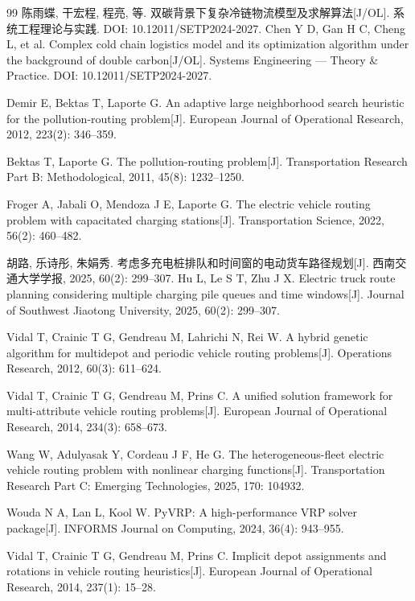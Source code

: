 \documentclass{setp-new}
\begin{document}
\begin{thebibliography}{99}
 陈雨蝶, 干宏程, 程亮, 等. 双碳背景下复杂冷链物流模型及求解算法[J/OL]. 系统工程理论与实践. DOI: 10.12011/SETP2024-2027.\newline
Chen Y D, Gan H C, Cheng L, et al. Complex cold chain logistics model and its optimization algorithm under the background of double carbon[J/OL]. Systems Engineering --- Theory \& Practice. DOI: 10.12011/SETP2024-2027.

 Demir E, Bektas T, Laporte G. An adaptive large neighborhood search heuristic for the pollution-routing problem[J]. European Journal of Operational Research, 2012, 223(2): 346--359.

 Bektas T, Laporte G. The pollution-routing problem[J]. Transportation Research Part B: Methodological, 2011, 45(8): 1232--1250.

 Froger A, Jabali O, Mendoza J E, Laporte G. The electric vehicle routing problem with capacitated charging stations[J]. Transportation Science, 2022, 56(2): 460--482.

 胡路, 乐诗彤, 朱娟秀. 考虑多充电桩排队和时间窗的电动货车路径规划[J]. 西南交通大学学报, 2025, 60(2): 299--307.\newline
Hu L, Le S T, Zhu J X. Electric truck route planning considering multiple charging pile queues and time windows[J]. Journal of Southwest Jiaotong University, 2025, 60(2): 299--307.

 Vidal T, Crainic T G, Gendreau M, Lahrichi N, Rei W. A hybrid genetic algorithm for multidepot and periodic vehicle routing problems[J]. Operations Research, 2012, 60(3): 611--624.

 Vidal T, Crainic T G, Gendreau M, Prins C. A unified solution framework for multi-attribute vehicle routing problems[J]. European Journal of Operational Research, 2014, 234(3): 658--673.

 Wang W, Adulyasak Y, Cordeau J F, He G. The heterogeneous-fleet electric vehicle routing problem with nonlinear charging functions[J]. Transportation Research Part C: Emerging Technologies, 2025, 170: 104932.

 Wouda N A, Lan L, Kool W. PyVRP: A high-performance VRP solver package[J]. INFORMS Journal on Computing, 2024, 36(4): 943--955.

 Vidal T, Crainic T G, Gendreau M, Prins C. Implicit depot assignments and rotations in vehicle routing heuristics[J]. European Journal of Operational Research, 2014, 237(1): 15--28.


\end{thebibliography}
\end{document}

